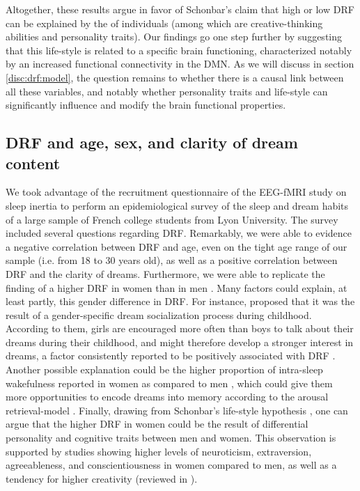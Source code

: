 Altogether, these results argue in favor of Schonbar's claim \citeyearpar{schonbar_differential_1965} that high or low DRF can be explained by the  of individuals (among which are creative-thinking abilities and personality traits). Our findings go one step further by suggesting that this life-style is related to a specific brain functioning, characterized notably by an increased functional connectivity in the DMN. As we will discuss in section \ref{disc:drf:model}, the question remains to whether there is a causal link between all these variables, and notably whether personality traits and life-style can significantly influence and modify the brain functional properties.

\subsection{DRF and age, sex, and clarity of dream content}
\label{disc:drf:summary:survey}

We took advantage of the recruitment questionnaire of the EEG-fMRI study on sleep inertia to perform an epidemiological survey of the sleep and dream habits of a large sample of French college students from Lyon University. The survey included several questions regarding DRF. Remarkably, we were able to evidence a negative correlation between DRF and age, even on the tight age range of our sample (i.e. from 18 to 30 years old), as well as a positive correlation between DRF and the clarity of dreams. Furthermore, we were able to replicate the finding of a higher DRF in women than in men \citep{schredl_gender_2008}. Many factors could explain, at least partly, this gender difference in DRF. For instance, \citet{schredl_gender_2008} proposed that it was the result of a gender-specific dream socialization process during childhood. According to them, girls are encouraged more often than boys to talk about their dreams during their childhood, and might therefore develop a stronger interest in dreams, a factor consistently reported to be positively associated with DRF \citep{schredl_factors_2003}. Another possible explanation could be the higher proportion of intra-sleep wakefulness reported in women as compared to men \citep{reyner_gender-and_1995}, which could give them more opportunities to encode dreams into memory according to the arousal retrieval-model \citep{koulack_dream_1976}. Finally, drawing from Schonbar's life-style hypothesis \citeyearpar{schonbar_differential_1965}, one can argue that the higher DRF in women could be the result of differential personality and cognitive traits between men and women. This observation is supported by studies showing higher levels of neuroticism, extraversion, agreeableness, and conscientiousness in women compared to men, as well as a tendency for higher creativity (reviewed in \citealp{schmitt_why_2009, baer_gender_2008}).

